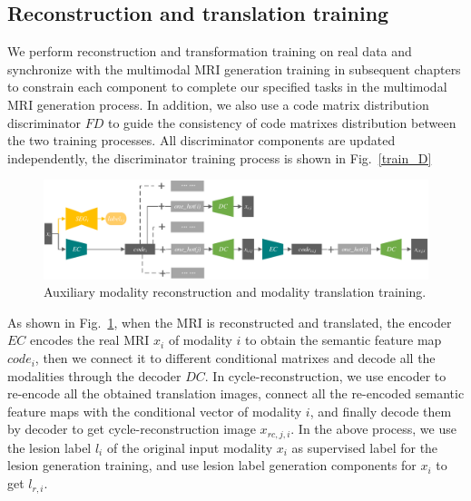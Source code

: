 \documentclass[letterpaper]{article} %
\begin{document}
\subsection{Reconstruction and translation training}
We perform reconstruction and transformation training on real data and synchronize with the multimodal MRI generation training in subsequent chapters to constrain each component to complete our specified tasks in the multimodal MRI generation process. In addition, we also use a code matrix distribution discriminator $FD$ to guide the consistency of code matrixes distribution between the two training processes. All discriminator components are updated independently, the discriminator training process is shown in Fig.~\ref{train_D}

\begin{figure}
	\centering
	\includegraphics[width=0.95\columnwidth]{figures/trans_train}
	\caption{Auxiliary modality reconstruction and modality translation training.}
	\label{trans_train}
\end{figure}

As shown in Fig.~\ref{trans_train}, when the MRI is reconstructed and translated, the encoder $EC$ encodes the real MRI $x_i$ of modality $i$ to obtain the semantic feature map $code_{i}$, then we connect it to different conditional matrixes and decode all the modalities through the decoder $DC$. In cycle-reconstruction, we use encoder to re-encode all the obtained translation images, connect all the re-encoded semantic feature maps with the conditional vector of modality $i$, and finally decode them by decoder to get cycle-reconstruction image $x_{rc,j,i}$. In the above process, we use the lesion label $l_i$ of the original input modality $x_i$ as supervised label for the lesion generation training, and use lesion label generation components for $x_i$ to get $l_{r,i}$.
\end{document}

